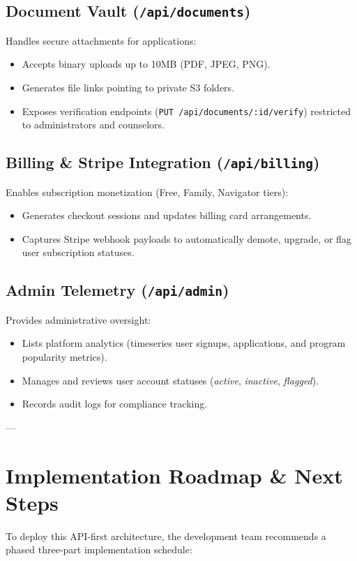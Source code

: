 \documentclass[11pt,a4paper]{article}
\begin{document}
\subsection{Document Vault (\texttt{/api/documents})}
Handles secure attachments for applications:
\begin{itemize}
    \item Accepts binary uploads up to 10MB (PDF, JPEG, PNG).
    \item Generates file links pointing to private S3 folders.
    \item Exposes verification endpoints (\texttt{PUT /api/documents/:id/verify}) restricted to administrators and counselors.
\end{itemize}

\subsection{Billing \& Stripe Integration (\texttt{/api/billing})}
Enables subscription monetization (Free, Family, Navigator tiers):
\begin{itemize}
    \item Generates checkout sessions and updates billing card arrangements.
    \item Captures Stripe webhook payloads to automatically demote, upgrade, or flag user subscription statuses.
\end{itemize}

\subsection{Admin Telemetry (\texttt{/api/admin})}
Provides administrative oversight:
\begin{itemize}
    \item Lists platform analytics (timeseries user signups, applications, and program popularity metrics).
    \item Manages and reviews user account statuses (\textit{active}, \textit{inactive}, \textit{flagged}).
    \item Records audit logs for compliance tracking.
\end{itemize}

---

\section{Implementation Roadmap \& Next Steps}
To deploy this API-first architecture, the development team recommends a phased three-part implementation schedule:
\end{document}
